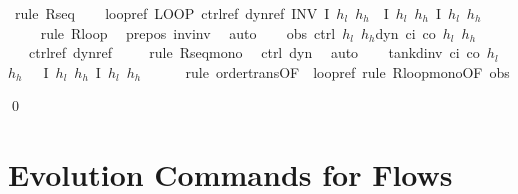 \documentclass[envcountsame,envcountsect]{llncs}
\begin{document}
\begin{example}
\begin{isabellebody}
\ {\isacharparenleft}rule\ R{\isacharunderscore}seq{\isacharparenright}\isanewline
\ \ \isamarkupfalse%
\ loopref{\isacharcolon}\ {\isachardoublequoteopen}LOOP\ {\isacharquery}ctrl{\isacharunderscore}ref{\isacharsemicolon}\ {\isacharquery}dyn{\isacharunderscore}ref\ INV\ I\ $h_l$\ $h_h$\ {\isasymle}\ \isactrlbold {\isacharbrackleft}I\ $h_l$\ $h_h${\isacharcomma}\ I\ $h_l$\ $h_h$\isactrlbold {\isacharbrackright}{\isachardoublequoteclose}\isanewline
\ \ \ \ \isamarkupfalse%
{\isacharparenleft}rule\ R{\isacharunderscore}loop{\isacharparenright}\ \isamarkupfalse%
\ pre{\isacharunderscore}pos\ inv{\isacharunderscore}inv\ \isamarkupfalse%
\ auto\isanewline
\ \ \isamarkupfalse%
\ obs{\isacharcolon}\ {\isachardoublequoteopen}{\isacharparenleft}ctrl\ $h_l$\ $h_h${\isacharsemicolon}dyn\ c\isactrlsub i\ c\isactrlsub o\ $h_l$\ $h_h$\ {\isasymtau}{\isacharparenright}\ {\isasymle}\ {\isacharquery}ctrl{\isacharunderscore}ref{\isacharsemicolon}\ {\isacharquery}dyn{\isacharunderscore}ref{\isachardoublequoteclose}\isanewline
\ \ \ \ \isamarkupfalse%
{\isacharparenleft}rule\ R{\isacharunderscore}seq{\isacharunderscore}mono{\isacharparenright}\ \isamarkupfalse%
\ ctrl\ dyn\ \isamarkupfalse%
\ auto\isanewline
\ \ \isamarkupfalse%
\ {\isachardoublequoteopen}tank{\isacharunderscore}dinv\ c\isactrlsub i\ c\isactrlsub o\ $h_l$\ $h_h$\ {\isasymtau}\ {\isasymle}\ \isactrlbold {\isacharbrackleft}I\ $h_l$\ $h_h${\isacharcomma}\ I\ $h_l$\ $h_h$\isactrlbold {\isacharbrackright}{\isachardoublequoteclose}\isanewline
\ \ \ \ \isamarkupfalse%
\ {\isacharparenleft}rule\ order{\isacharunderscore}trans{\isacharbrackleft}OF\ {\isacharunderscore}\ loopref{\isacharbrackright}{\isacharcomma}\ rule\ R{\isacharunderscore}loop{\isacharunderscore}mono{\isacharbrackleft}OF\ obs{\isacharbrackright}{\isacharparenright}\isanewline
{}\isamarkupfalse%
\end{isabellebody}
\qed
\end{example}


\section{Evolution Commands for Flows}\label{sec:from-flows}
\end{document}
